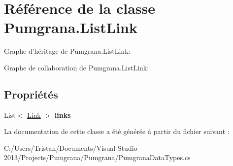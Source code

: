 \hypertarget{class_pumgrana_1_1_list_link}{\section{Référence de la classe Pumgrana.\+List\+Link}
\label{class_pumgrana_1_1_list_link}
}


Graphe d'héritage de Pumgrana.\+List\+Link\+:


Graphe de collaboration de Pumgrana.\+List\+Link\+:
\subsection*{Propriétés}
\begin{DoxyCompactItemize}
\item 
\hypertarget{class_pumgrana_1_1_list_link_a786ba40aaa15be083271445bb81f56ba}{List$<$ \hyperlink{class_pumgrana_1_1_link}{Link} $>$ {\bfseries links}}\label{class_pumgrana_1_1_list_link_a786ba40aaa15be083271445bb81f56ba}

\end{DoxyCompactItemize}


La documentation de cette classe a été générée à partir du fichier suivant \+:\begin{DoxyCompactItemize}
\item 
C\+:/\+Users/\+Tristan/\+Documents/\+Visual Studio 2013/\+Projects/\+Pumgrana/\+Pumgrana/Pumgrana\+Data\+Types.\+cs\end{DoxyCompactItemize}
